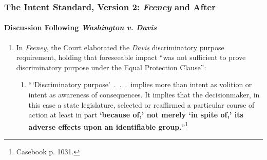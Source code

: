 % 
% 
% 
% 
% 
% 
\subsubsection{The Intent Standard, Version 2: \emph{Feeney} and After}

\paragraph{Discussion Following \emph{Washington v. Davis}}

\begin{enumerate}
    \item In \emph{Feeney}, the Court elaborated the \emph{Davis} 
    discriminatory purpose requirement, holding that foreseeable impact ``was 
    not sufficient to prove discriminatory purpose under the Equal Protection 
    Clause'':
    \begin{enumerate}
        \item \enquote{\enquote{Discriminatory purpose}~.~.~.~implies more 
        than intent as volition or intent as awareness of consequences. It 
        implies that the decisionmaker, in this case a state legislature, 
        selected or reaffirmed a particular course of action at least in part 
        \textbf{`because of,' not merely `in spite of,' its adverse effects 
        upon an identifiable group.}}\footnote{Casebook p. 1031.}
    \end{enumerate}
\end{enumerate}

